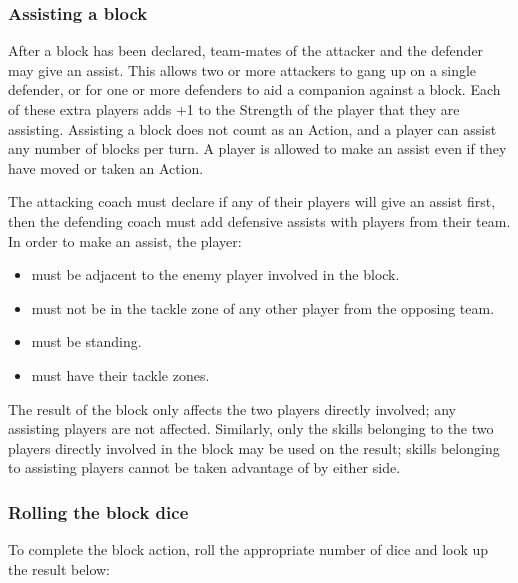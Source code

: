 \documentclass{article}
\begin{document}
\begin{multicols}{2}
\subsubsection{Assisting a block}
\par After a block has been declared, team-mates of the attacker and the defender may give an assist. This allows two or more attackers to gang up on a single defender, or for one or more defenders to aid a companion against a block. Each of these extra players adds +1 to the Strength of the player that they are assisting. Assisting a block does not count as an Action, and a player can assist any number of blocks per turn. A player is allowed to make an assist even if they have moved or taken an Action.
\par The attacking coach must declare if any of their players will give an assist first, then the defending coach must add defensive assists with players from their team. In order to make an assist, the player:

\begin{itemize}
\item must be adjacent to the enemy player involved in the block.
\item must not be in the tackle zone of any other player from the opposing team.
\item must be standing.
\item must have their tackle zones.
\end{itemize}

\par The result of the block only affects the two players directly involved; any assisting players are not affected. Similarly, only the skills belonging to the two players directly involved in the block may be used on the result; skills belonging to assisting players cannot be taken advantage of by either side.

\subsubsection{Rolling the block dice}
\par To complete the block action, roll the appropriate number of dice and look up the result below:

\medskip


\end{multicols}
\end{document}
